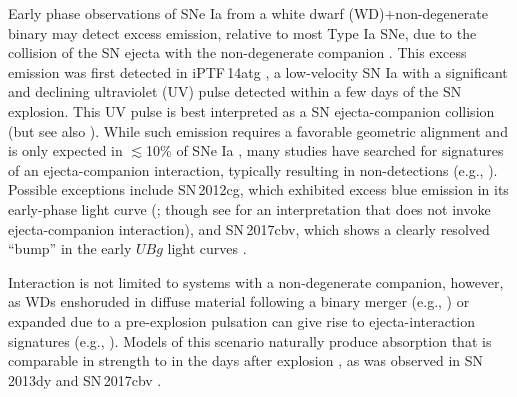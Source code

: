 \documentclass[twocolumn]{aastex61}
\newcommand{\ycao}[1]{{\color{red} ycao: {#1}}}
\begin{document}
Early phase observations of SNe Ia from a white dwarf (WD)$+$non-degenerate binary
may detect excess emission, relative to most Type Ia SNe, due to the 
collision of the SN ejecta with the non-degenerate companion 
\citep{1973ApJ...186.1007W,2010ApJ...708.1025K}. This excess 
emission was first detected in iPTF\,14atg  \citep{2015Natur.521..328C}, a low-velocity SN Ia with a significant and declining ultraviolet (UV) pulse detected within a
few days of the SN explosion. This UV pulse is best interpreted as a SN ejecta-companion collision (but see also \citealt{2016MNRAS.459.4428K,2017arXiv170603613N}). While such emission requires a 
favorable geometric alignment and is only expected in $\lesssim$10\% of SNe Ia \citep{2010ApJ...708.1025K}, many studies have 
searched for signatures of an ejecta-companion interaction, 
typically resulting in non-detections 
(e.g., \citealt{2010ApJ...722.1691H,2011ApJ...741...20B,2012ApJ...744...38F,
  2012ApJ...744L..17B,2015Natur.521..332O,
  2013ApJ...778L..15Z,2015ApJ...799..106G,2016ApJ...826..144S,
  2015ApJS..221...22I}). Possible exceptions include SN\,2012cg, 
which exhibited excess blue emission in its early-phase light curve 
(\citealt{2016ApJ...820...92M}; though see 
\citealt{2016arXiv161007601S} for an interpretation that does not 
invoke ejecta-companion interaction), and SN\,2017cbv, which shows a clearly resolved ``bump'' in the early $UBg$ light curves \citep{2017arXiv170608990H}. 

Interaction is not limited to systems with a non-degenerate companion, however, as WDs enshoruded in diffuse material following a binary merger (e.g., \citealt{2015MNRAS.447.2803L}) or expanded due to a pre-explosion pulsation can give rise to ejecta-interaction signatures (e.g., \citealt{2014MNRAS.441..532D}). Models of this scenario naturally produce  absorption that is comparable in strength to  in the days after explosion \citep{2014MNRAS.441..532D}, as was observed in SN\,2013dy \citep{2013ApJ...778L..15Z} and SN\,2017cbv \citep{2017arXiv170608990H}.
\end{document}
